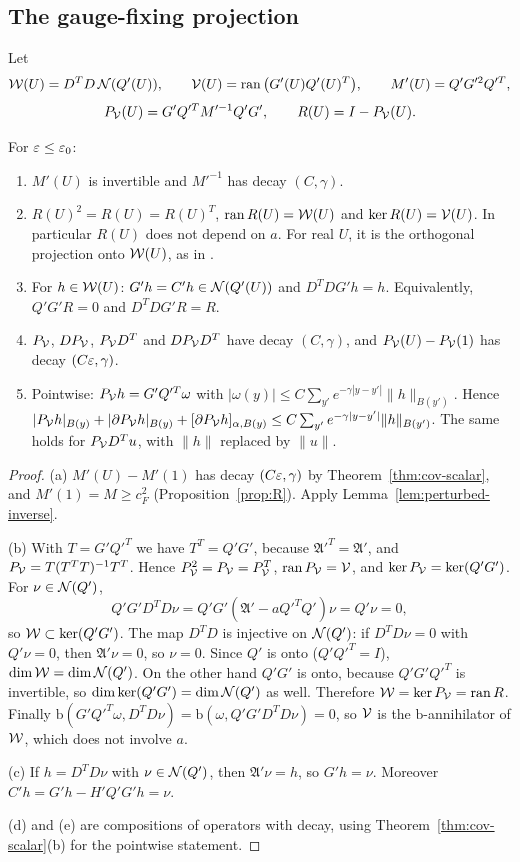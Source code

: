 \subsection{The gauge-fixing projection}

Let
\[
\mathcal W(U)=D^TD\,\mathcal N(Q'(U)),\qquad \mathcal V(U)=\operatorname{ran}\big(G'(U)Q'(U)^T\big),\qquad M'(U)=Q'G'^2Q'^T,
\]
\[
P_\mathcal V(U)=G'Q'^TM'^{-1}Q'G',\qquad R(U)=I-P_\mathcal V(U).
\]

\begin{proposition}\label{prop:cov-R}
For $\varepsilon\le\varepsilon_0$:
\begin{enumerate}[label=(\alph*)]
\item $M'(U)$ is invertible and $M'^{-1}$ has decay $(C,\gamma)$.
\item $R(U)^2=R(U)=R(U)^T$, $\operatorname{ran} R(U)=\mathcal W(U)$ and $\ker R(U)=\mathcal V(U)$. In particular $R(U)$ does not depend on $a$. For real $U$, it is the orthogonal projection onto $\mathcal W(U)$, as in \cite[(3.21), (3.25)]{BalBackground}.
\item For $h\in\mathcal W(U)$: $G'h=C'h\in\mathcal N(Q'(U))$ and $D^TDG'h=h$. Equivalently, $Q'G'R=0$ and $D^TDG'R=R$.
\item $P_\mathcal V$, $DP_\mathcal V$, $P_\mathcal V D^T$ and $DP_\mathcal V D^T$ have decay $(C,\gamma)$, and $P_\mathcal V(U)-P_\mathcal V(1)$ has decay $(C\varepsilon,\gamma)$.
\item Pointwise: $P_\mathcal V h=G'Q'^T\omega$ with $|\omega(y)|\le C\sum_{y'}e^{-\gamma|y-y'|}\|h\|_{B(y')}$. Hence $|P_\mathcal V h|_{B(y)}+|\partial P_\mathcal V h|_{B(y)}+[\partial P_\mathcal V h]_{\alpha,B(y)}\le C\sum_{y'}e^{-\gamma|y-y'|}\|h\|_{B(y')}$. The same holds for $P_\mathcal V D^Tu$, with $\|h\|$ replaced by $\|u\|$.
\end{enumerate}
\end{proposition}

\begin{proof}
(a) $M'(U)-M'(1)$ has decay $(C\varepsilon,\gamma)$ by Theorem~\ref{thm:cov-scalar}, and $M'(1)=M\ge c_F^2$ (Proposition~\ref{prop:R}). Apply Lemma~\ref{lem:perturbed-inverse}.

(b) With $T=G'Q'^T$ we have $T^T=Q'G'$, because $\mathfrak A'^T=\mathfrak A'$, and $P_\mathcal V=T(T^TT)^{-1}T^T$. Hence $P_\mathcal V^2=P_\mathcal V=P_\mathcal V^T$, $\operatorname{ran} P_\mathcal V=\mathcal V$, and $\ker P_\mathcal V=\ker(Q'G')$. For $\nu\in\mathcal N(Q')$,
\[
Q'G'D^TD\nu=Q'G'(\mathfrak A'-aQ'^TQ')\nu=Q'\nu=0,
\]
so $\mathcal W\subset\ker(Q'G')$. The map $D^TD$ is injective on $\mathcal N(Q')$: if $D^TD\nu=0$ with $Q'\nu=0$, then $\mathfrak A'\nu=0$, so $\nu=0$. Since $Q'$ is onto ($Q'Q'^T=I$), $\dim\mathcal W=\dim\mathcal N(Q')$. On the other hand $Q'G'$ is onto, because $Q'G'Q'^T$ is invertible, so $\dim\ker(Q'G')=\dim\mathcal N(Q')$ as well. Therefore $\mathcal W=\ker P_\mathcal V=\operatorname{ran} R$. Finally $\mathrm b(G'Q'^T\omega,D^TD\nu)=\mathrm b(\omega,Q'G'D^TD\nu)=0$, so $\mathcal V$ is the $\mathrm b$-annihilator of $\mathcal W$, which does not involve $a$.

(c) If $h=D^TD\nu$ with $\nu\in\mathcal N(Q')$, then $\mathfrak A'\nu=h$, so $G'h=\nu$. Moreover $C'h=G'h-H'Q'G'h=\nu$.

(d) and (e) are compositions of operators with decay, using Theorem~\ref{thm:cov-scalar}(b) for the pointwise statement.
\end{proof}
